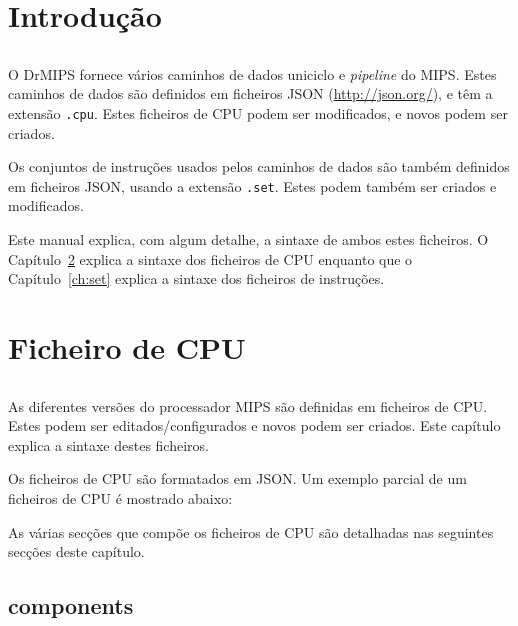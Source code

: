 \documentclass[11pt,a4paper,twoside,titlepage]{report}
\author{Bruno Nova}
\title{\Title}
\begin{document}
\maketitle
\tableofcontents


\chapter{Introdução}

\section*{}

O DrMIPS fornece vários caminhos de dados uniciclo e \emph{pipeline} do MIPS.
Estes caminhos de dados são definidos em ficheiros JSON (\url{http://json.org/}),
e têm a extensão \verb+.cpu+.
Estes ficheiros de CPU podem ser modificados, e novos podem ser criados.

Os conjuntos de instruções usados pelos caminhos de dados são também definidos
em ficheiros JSON, usando a extensão \verb+.set+.
Estes podem também ser criados e modificados.

Este manual explica, com algum detalhe, a sintaxe de ambos estes ficheiros.
O Capítulo~\ref{ch:cpu} explica a sintaxe dos ficheiros de CPU enquanto que
o Capítulo~\ref{ch:set} explica a sintaxe dos ficheiros de instruções.


\chapter{Ficheiro de CPU} \label{ch:cpu}

\section*{}

As diferentes versões do processador MIPS são definidas em ficheiros de CPU.
Estes podem ser editados/configurados e novos podem ser criados.
Este capítulo explica a sintaxe destes ficheiros.

Os ficheiros de CPU são formatados em JSON.
Um exemplo parcial de um ficheiros de CPU é mostrado abaixo:



As várias secções que compõe os ficheiros de CPU são detalhadas nas seguintes
secções deste capítulo.


\section{components}
\end{document}
